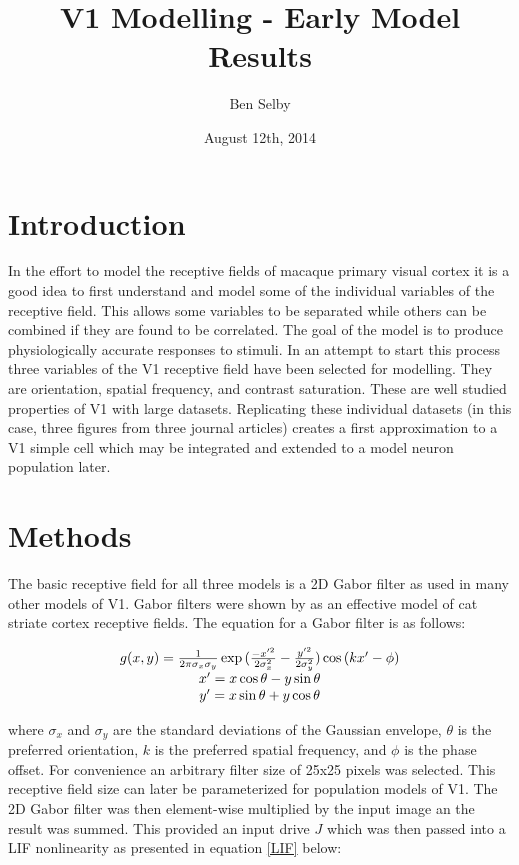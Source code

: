\documentclass{article}
\title{V1 Modelling - Early Model Results}
\author{Ben Selby}
\date{August 12th, 2014}
\begin{document}
\maketitle

\section{Introduction}

In the effort to model the receptive fields of macaque primary visual cortex it is a good idea to first understand and model some of the individual variables of the receptive field. This allows some variables to be separated while others can be combined if they are found to be correlated. The goal of the model is to produce physiologically accurate responses to stimuli. In an attempt to start this process three variables of the V1 receptive field have been selected for modelling. They are orientation, spatial frequency, and contrast saturation. These are well studied properties of V1 with large datasets. Replicating these individual datasets (in this case, three figures from three journal articles) creates a first approximation to a V1 simple cell which may be integrated and extended to a model neuron population later. 

\section{Methods}

The basic receptive field for all three models is a 2D Gabor filter as used in many other models of V1. Gabor filters were shown by \citet{jp87} as an effective model of cat striate cortex receptive fields. The equation for a Gabor filter is as follows:

\begin{equation}
\begin{split}
\begin{matrix}
g(x,y) = {1 \over 2\pi \sigma_x \sigma_y}\exp{({-x'^2 \over 2\sigma_x^2} - {y'^2 \over 2\sigma_y^2})
}\cos{(kx'-\phi)} \\
x' = x\cos\theta - y\sin\theta \\
y' = x\sin\theta + y\cos\theta
\label{gabor_eq}
\end{matrix}
\end{split}
\end{equation}

where $\sigma_x$ and $\sigma_y$ are the standard deviations of the Gaussian envelope, $\theta$ is the preferred orientation, $k$ is the preferred spatial frequency, and $\phi$ is the phase offset. For convenience an arbitrary filter size of 25x25 pixels was selected. This receptive field size can later be parameterized for population models of V1. The 2D Gabor filter was then element-wise multiplied by the input image an the result was summed. This provided an input drive $J$ which was then passed into a LIF nonlinearity as presented in equation \ref{LIF} below:
\end{document}
